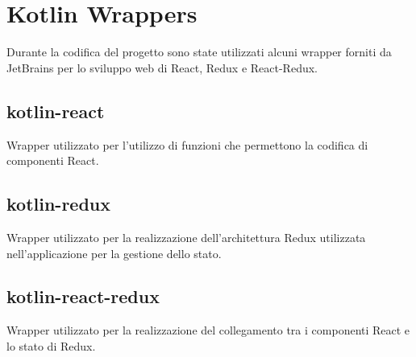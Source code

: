 \section{Kotlin Wrappers}
Durante la codifica del progetto sono state utilizzati alcuni wrapper forniti da JetBrains per lo sviluppo web di React, Redux e React-Redux.

\subsection{kotlin-react}
Wrapper utilizzato per l'utilizzo di funzioni che permettono la codifica di componenti React.

\subsection{kotlin-redux}
Wrapper utilizzato per la realizzazione dell'architettura Redux utilizzata nell'applicazione per la gestione dello stato.

\subsection{kotlin-react-redux}
Wrapper utilizzato per la realizzazione del collegamento tra i componenti React e lo stato di Redux.










